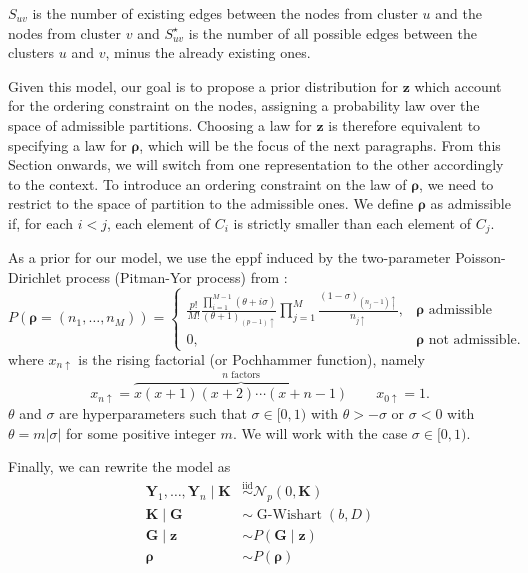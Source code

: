 $S_{uv}$ is the number of existing edges between the nodes from cluster $u$ and the nodes from cluster $v$ and $S^{\star}_{uv}$ is the number of all possible edges between the clusters $u$ and $v$, minus the already existing ones. 

Given this model, our goal is to propose a prior distribution for $\bm{z}$ which account for the ordering constraint on the nodes, assigning a probability law over the space of admissible partitions.
Choosing a law for $\bm{z}$ is therefore equivalent to specifying a law for $\bm{\rho}$, which will be the focus of the next paragraphs. From this Section onwards, we will switch from one representation to the other accordingly to the context. To introduce an ordering constraint on the law of $\bm{\rho}$, we need to restrict to the space of partition to the admissible ones.
We define $\bm{\rho}$ as admissible if, for each $i<j$, each element of $C_i$ is strictly smaller than each element of $C_j$. 

As a prior for our model, we use the \gls{eppf} induced by the two-parameter Poisson-Dirichlet process (Pitman-Yor process) from \textcite[830]{martinezNonparametricChangePoint2014}:
\begin{equation}
    P(\bm{\rho} = (n_1, \ldots, n_M))
    =
    \begin{cases}
        \frac{p!}{M!} \frac{ \prod_{i=1}^{M-1}{(\theta +i\sigma)} }{(\theta+1)_{(p-1)\uparrow}} \prod_{j=1}^{M}{\frac{(1-\sigma)_{(n_{j}-1)\uparrow}}{n_{j\uparrow}} }, & \bm{\rho} \text{ admissible}\\
                0, & \bm{\rho} \text{ not admissible.}
    \end{cases}
    \label{eq:prior}
\end{equation}
where $x_{n\uparrow}$ is the rising factorial (or Pochhammer function), namely
\begin{equation*}
x_{n\uparrow} = \overbrace{x(x+1)(x+2)\cdots(x+n-1)}^{n\text{ factors}} \qquad x_{0\uparrow}=1.
\end{equation*}
$\theta$ and $\sigma$ are hyperparameters such that $\sigma\in[0,1)$ with $\theta>-\sigma$ or $\sigma<0$ with $\theta=m|\sigma|$ for some positive integer $m$. We will work with the case $\sigma\in[0,1)$.

Finally, we can rewrite the model as
 \begin{align*}
    \bm{Y}_1,\ldots,\bm{Y}_n \mid \bm{K} & \overset{\mathrm{iid}}{\sim} \mathcal{N}_p(0,\bm{K}) \\
    \bm{K} \mid \bm{G} & \sim \operatorname{G-Wishart}(b,D) \\
    \bm{G} \mid \bm{z} & \sim P(\bm{G}\mid\bm{z})\\
    \bm{\rho} & \sim P(\bm{\rho})
\end{align*}

